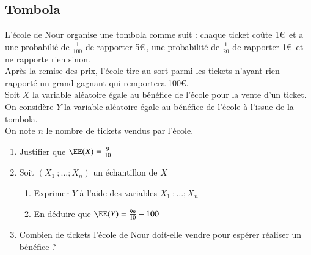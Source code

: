\documentclass[oneside,12pt]{article}          %
\begin{document}
\subsection{Tombola}
L'école de Nour organise une tombola comme suit : chaque ticket coûte 1\euro\, et a une probabilié de $\frac{1}{100}$ de rapporter 5\euro\,, une probabilité de $\frac{1}{20}$ de rapporter 1\euro\, et ne rapporte rien sinon.\\
Après la remise des prix, l'école tire au sort parmi les tickets n'ayant rien rapporté un grand gagnant qui remportera 100\euro.\\
Soit $X$ la variable aléatoire égale au bénéfice de l'école pour la vente d'un ticket.\\
On considère $Y$ la variable aléatoire égale au bénéfice de l'école à l'issue de la tombola.\\
On note $n$ le nombre de tickets vendus par l'école.
\begin{enumerate}
    \item Justifier que $\EE(X)=\frac{9}{10}$
    \item Soit $(X_1~;\ldots;X_n)$ un échantillon de $X$
    \begin{enumerate}
        \item Exprimer $Y$ à l'aide des variables $X_1 ~;\ldots;X_n$
        \item En déduire que $\EE(Y)=\frac{9n}{10}-100$
    \end{enumerate}
    \item Combien de tickets l'école de Nour doit-elle vendre pour espérer réaliser un bénéfice ?
\end{enumerate}
\end{document}
